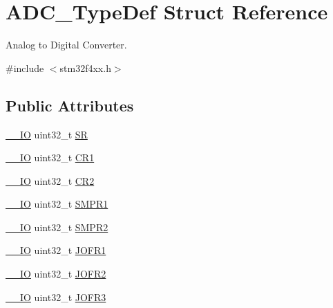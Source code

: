 \hypertarget{struct_a_d_c___type_def}{}\section{A\+D\+C\+\_\+\+Type\+Def Struct Reference}
\label{struct_a_d_c___type_def}


Analog to Digital Converter.  




{\ttfamily \#include $<$stm32f4xx.\+h$>$}

\subsection*{Public Attributes}
\begin{DoxyCompactItemize}
\item 
\hyperlink{core__cm4_8h_aec43007d9998a0a0e01faede4133d6be}{\+\_\+\+\_\+\+IO} uint32\+\_\+t \hyperlink{struct_a_d_c___type_def_a9745df96e98f3cdc2d05ccefce681f64}{SR}
\item 
\hyperlink{core__cm4_8h_aec43007d9998a0a0e01faede4133d6be}{\+\_\+\+\_\+\+IO} uint32\+\_\+t \hyperlink{struct_a_d_c___type_def_a89b1ff4376683dd2896ea8b32ded05b2}{C\+R1}
\item 
\hyperlink{core__cm4_8h_aec43007d9998a0a0e01faede4133d6be}{\+\_\+\+\_\+\+IO} uint32\+\_\+t \hyperlink{struct_a_d_c___type_def_a1053a65a21af0d27afe1bf9cf7b7aca7}{C\+R2}
\item 
\hyperlink{core__cm4_8h_aec43007d9998a0a0e01faede4133d6be}{\+\_\+\+\_\+\+IO} uint32\+\_\+t \hyperlink{struct_a_d_c___type_def_a73009a8122fcc628f467a4e997109347}{S\+M\+P\+R1}
\item 
\hyperlink{core__cm4_8h_aec43007d9998a0a0e01faede4133d6be}{\+\_\+\+\_\+\+IO} uint32\+\_\+t \hyperlink{struct_a_d_c___type_def_a9e68fe36c4c8fbbac294b5496ccf7130}{S\+M\+P\+R2}
\item 
\hyperlink{core__cm4_8h_aec43007d9998a0a0e01faede4133d6be}{\+\_\+\+\_\+\+IO} uint32\+\_\+t \hyperlink{struct_a_d_c___type_def_aa005e656f528aaad28d70d61c9db9b81}{J\+O\+F\+R1}
\item 
\hyperlink{core__cm4_8h_aec43007d9998a0a0e01faede4133d6be}{\+\_\+\+\_\+\+IO} uint32\+\_\+t \hyperlink{struct_a_d_c___type_def_aa20f76044c11042dde41c1060853fb82}{J\+O\+F\+R2}
\item 
\hyperlink{core__cm4_8h_aec43007d9998a0a0e01faede4133d6be}{\+\_\+\+\_\+\+IO} uint32\+\_\+t \hyperlink{struct_a_d_c___type_def_ae9c78142f6edf8122384263878d09015}{J\+O\+F\+R3}
\item 

\end{DoxyCompactItemize}
